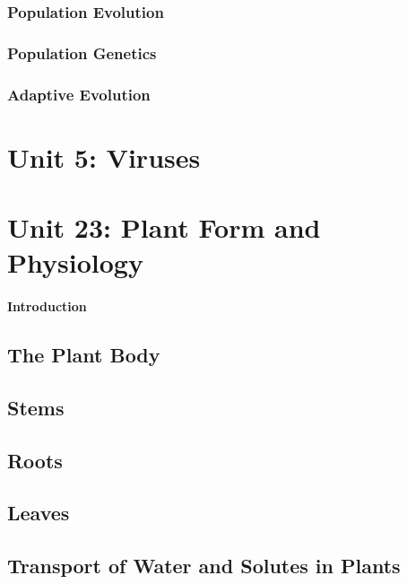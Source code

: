 \subsubsection{Population Evolution}
\subsubsection{Population Genetics}
\subsubsection{Adaptive Evolution}

\section{Unit 5: Viruses}

\section{Unit 23: Plant Form and Physiology}
\paragraph{Introduction}
\subsection{The Plant Body}
\subsection{Stems}
\subsection{Roots}
\subsection{Leaves}
\subsection{Transport of Water and Solutes in Plants}

